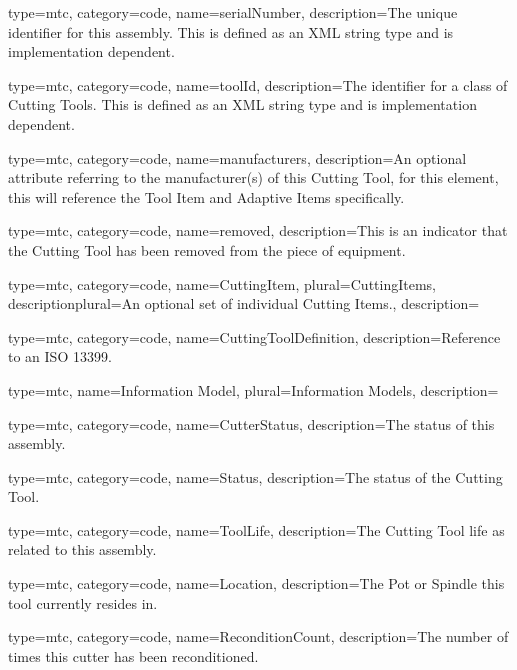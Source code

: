 {
  type=mtc,
  category=code,
  name={serialNumber},
  description={The unique identifier for this assembly. This is defined as an XML string type and is implementation dependent.}
}

{
  type=mtc,
  category=code,
  name={toolId},
  description={The identifier for a class of Cutting Tools. This is defined as an XML string type and is implementation dependent. }
}

{
  type=mtc,
  category=code,
  name={manufacturers},
  description={An optional attribute referring to the manufacturer(s) of this Cutting Tool, for this element, this will reference the Tool Item and Adaptive Items specifically. }
}

{
  type=mtc,
  category=code,
  name={removed},
  description={This is an indicator that the Cutting Tool has been removed from the piece of equipment. }
}

{
  type=mtc,
  category=code,
  name={CuttingItem},
  plural={CuttingItems},
  descriptionplural={An optional set of individual Cutting Items.},
  description={}
}

{
  type=mtc,
  category=code,
  name={CuttingToolDefinition},
  description={Reference to an ISO 13399.}
}

{
  type=mtc,
  name={Information Model},
  plural={Information Models},
  description={}
}

{
  type=mtc,
  category=code,
  name={CutterStatus},
  description={The status of this assembly.}
}

{
  type=mtc,
  category=code,
  name={Status},
  description={The status of the Cutting Tool.}
}

{
  type=mtc,
  category=code,
  name={ToolLife},
  description={The Cutting Tool life as related to this assembly.}
}

{
  type=mtc,
  category=code,
  name={Location},
  description={The Pot or Spindle this tool currently resides in.}
}

{
  type=mtc,
  category=code,
  name={ReconditionCount},
  description={The number of times this cutter has been reconditioned.}
}

